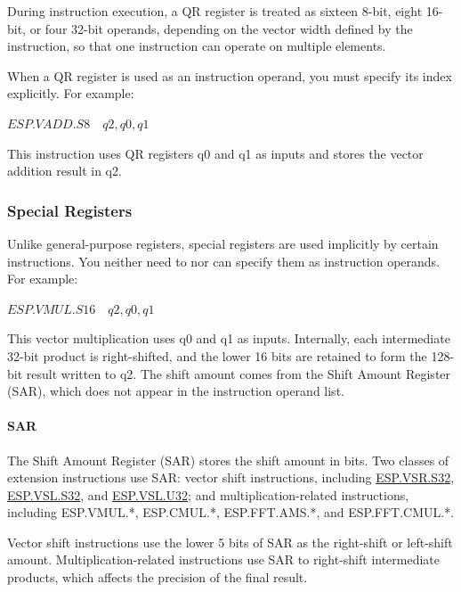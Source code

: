 \documentclass[main\_\_EN.tex]{subfiles}
\begin{document}
During instruction execution, a QR register is treated as sixteen 8-bit, eight 16-bit, or four 32-bit operands, depending on the vector width defined by the instruction, so that one instruction can operate on multiple elements.

When a QR register is used as an instruction operand, you must specify its index explicitly. For example:

\begin{center}
$\hyperref[instruction:ESPVADDS8]{ESP.VADD.S8} \hspace{1em} q2, q0, q1$
\end{center}

This instruction uses QR registers q0 and q1 as inputs and stores the vector addition result in q2.

\subsubsection{Special Registers}
\label{sec:pie-spec-reg}

Unlike general-purpose registers, special registers are used implicitly by certain instructions. You neither need to nor can specify them as instruction operands. For example:

\begin{center}
    $\hyperref[instruction:ESPVMULS16]{ESP.VMUL.S16}\hspace{1em}q2, q0, q1$
\end{center}

This vector multiplication uses q0 and q1 as inputs. Internally, each intermediate 32-bit product is right-shifted, and the lower 16 bits are retained to form the 128-bit result written to q2. The shift amount comes from the Shift Amount Register (SAR), which does not appear in the instruction operand list.


\paragraph{SAR}
The Shift Amount Register (SAR) stores the shift amount in bits. Two classes of \chipname{} extension instructions use SAR: vector shift instructions, including \hyperref[instruction:ESPVSRS32]{ESP.VSR.S32}, \hyperref[instruction:ESPVSLS32]{ESP.VSL.S32}, and \hyperref[instruction:ESPVSLU32]{ESP.VSL.U32}; and multiplication-related instructions, including ESP.VMUL.*, ESP.CMUL.*, ESP.FFT.AMS.*, and ESP.FFT.CMUL.*.

Vector shift instructions use the lower 5 bits of SAR as the right-shift or left-shift amount. Multiplication-related instructions use SAR to right-shift intermediate products, which affects the precision of the final result.
\end{document}
